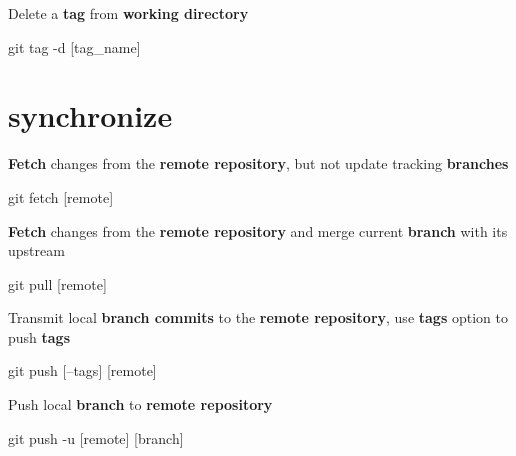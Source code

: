 \documentclass{refcard}
\begin{document}
Delete a \textbf{tag} from \textbf{working directory}
\begin{ttyenv}
git tag -d [tag_name]
\end{ttyenv}


\section{synchronize}

\textbf{Fetch} changes from the \textbf{remote repository}, but not update tracking \textbf{branches}
\begin{ttyenv}
git fetch [remote]
\end{ttyenv}

\textbf{Fetch} changes from the \textbf{remote repository} and merge current \textbf{branch} with its upstream
\begin{ttyenv}
git pull [remote]
\end{ttyenv}

Transmit local \textbf{branch commits} to the \textbf{remote repository}, use \textbf{tags} option to push \textbf{tags}
\begin{ttyenv}
git push [--tags] [remote]
\end{ttyenv}

Push local \textbf{branch} to \textbf{remote repository}
\begin{ttyenv}
git push -u [remote] [branch]
\end{ttyenv}

\rflicense
\end{document}
